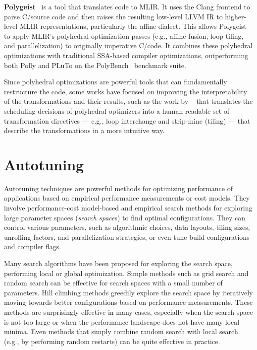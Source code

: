 \textbf{Polygeist}~\cite{moses2021polygeist} is a tool that translates \cpp code to MLIR\@. It uses the Clang frontend to parse C/\cpp source code and then raises the resulting low-level LLVM IR to higher-level MLIR representations, particularly the affine dialect. This allows Polygeist to apply MLIR's polyhedral optimization passes (e.g., affine fusion, loop tiling, and parallelization) to originally imperative C/\cpp code. It combines these polyhedral optimizations with traditional SSA-based compiler optimizations, outperforming both Polly and PLuTo on the PolyBench~\cite{pouchet2012polybench} benchmark suite.

Since polyhedral optimizations are powerful tools that can fundamentally restructure the code, some works have focused on improving the interpretability of the transformations and their results, such as the work by \citeauthor{bagneres2016opening}~\cite{bagneres2016opening} that translates the scheduling decisions of polyhedral optimizers into a human-readable set of transformation directives --- e.g., loop interchange and strip-mine (tiling) --- that describe the transformations in a more intuitive way.


\section{Autotuning}\label{sec:autotuning}

Autotuning techniques are powerful methods for optimizing performance of applications based on empirical performance measurements or cost models. They involve performance-cost model-based and empirical search methods for exploring large parameter spaces (\emph{search space}s) to find optimal configurations. They can control various parameters, such as algorithmic choices, data layouts, tiling sizes, unrolling factors, and parallelization strategies, or even tune build configurations and compiler flags.

Many search algorithms have been proposed for exploring the search space, performing local or global optimization. Simple methods such as grid search and random search can be effective for search spaces with a small number of parameters. Hill climbing methods greedily explore the search space by iteratively moving towards better configurations based on performance measurements. These methods are surprisingly effective in many cases, especially when the search space is not too large or when the performance landscape does not have many local minima. Even methods that simply combine random search with local search (e.g., by performing random restarts) can be quite effective in practice.

